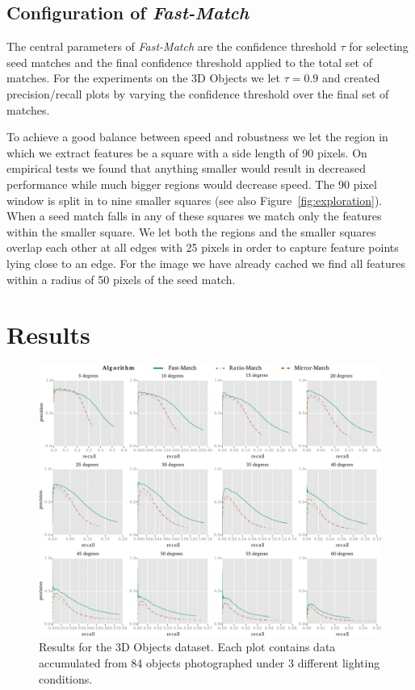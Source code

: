 \documentclass[runningheads]{llncs}
\begin{document}
\subsection{Configuration of \emph{Fast-Match}}
%
The central parameters of \emph{Fast-Match} are the confidence threshold $\tau$ for selecting seed matches and the final confidence threshold applied to the total set of matches. For the experiments on the 3D Objects we let $\tau = 0.9$ and created precision/recall plots by varying the confidence threshold over the final set of matches. 

To achieve a good balance between speed and robustness we let the region in which we extract features be a square with a side length of 90 pixels. On empirical tests we found that anything smaller would result in decreased performance while much bigger regions would decrease speed. The 90 pixel window is split in to nine smaller squares (see also Figure~\ref{fig:exploration}). When a seed match falls in any of these squares we match only the features within the smaller square. We let both the regions and the smaller squares overlap each other at all edges with 25 pixels in order to capture feature points lying close to an edge. For the image we have already cached we find all features within a radius of 50 pixels of the seed match.

\section{Results}
\label{results}
%
\begin{figure}[t]
\centering
\includegraphics[width=1\columnwidth]{images/grid_match_all}
\caption{Results for the 3D Objects dataset. Each plot contains data accumulated from 84 objects photographed under 3 different lighting conditions.}
\label{fig:all_objects}
\end{figure}
\end{document}
